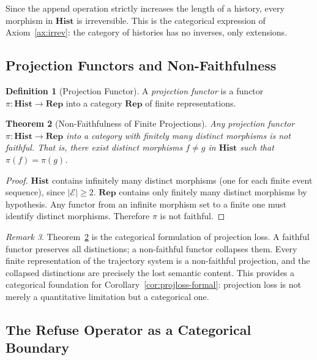 \documentclass[12pt, twoside]{article}
\theoremstyle{plain}
\newtheorem{theorem}{Theorem}[section]
\theoremstyle{definition}
\newtheorem{definition}[theorem]{Definition}
\theoremstyle{remark}
\newtheorem{remark}[theorem]{Remark}
\begin{document}
Since the append operation strictly increases the length of a
history, every morphism in $\mathbf{Hist}$ is irreversible.
This is the categorical expression of Axiom~\ref{ax:irrev}:
the category of histories has no inverses, only extensions.

\subsection{Projection Functors and Non-Faithfulness}

\begin{definition}[Projection Functor]
A \emph{projection functor} is a functor
$\pi: \mathbf{Hist} \to \mathbf{Rep}$
into a category $\mathbf{Rep}$ of finite representations.
\end{definition}

\begin{theorem}[Non-Faithfulness of Finite Projections]
\label{thm:nonfaithful}
Any projection functor $\pi: \mathbf{Hist} \to \mathbf{Rep}$
into a category with finitely many distinct morphisms is not faithful.
That is, there exist distinct morphisms $f \neq g$ in $\mathbf{Hist}$
such that $\pi(f) = \pi(g)$.
\end{theorem}

\begin{proof}
$\mathbf{Hist}$ contains infinitely many distinct morphisms
(one for each finite event sequence), since $|\mathcal{E}| \geq 2$.
$\mathbf{Rep}$ contains only finitely many distinct morphisms
by hypothesis.
Any functor from an infinite morphism set to a finite one must
identify distinct morphisms.
Therefore $\pi$ is not faithful.
\end{proof}

\begin{remark}
Theorem~\ref{thm:nonfaithful} is the categorical formulation of
projection loss.
A faithful functor preserves all distinctions; a non-faithful functor
collapses them.
Every finite representation of the trajectory system is a
non-faithful projection, and the collapsed distinctions are
precisely the lost semantic content.
This provides a categorical foundation for Corollary~\ref{cor:projloss-formal}:
projection loss is not merely a quantitative limitation
but a categorical one.
\end{remark}

\subsection{The Refuse Operator as a Categorical Boundary}
\end{document}
